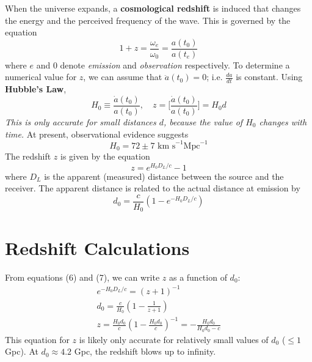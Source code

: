 \documentclass{article}
\begin{document}
When the universe expands, a \textbf{cosmological redshift} is induced that changes the energy and the perceived frequency of the wave. This is governed by the equation
\begin{equation}
    1+z = \frac{\omega_e}{\omega_0} = \frac{a(t_0)}{a(t_e)}
\end{equation}
where $e$ and $0$ denote \textit{emission} and \textit{observation} respectively. To determine a numerical value for $z$, we can assume that $\ddot{a}(t_0) = 0$; i.e. $\frac{da}{dt}$ is constant. Using \textbf{Hubble's Law}, 
\begin{equation}
    H_0 \equiv \frac{\dot{a}(t_0)}{a(t_0)}, \quad z = \Big[\frac{\dot{a}(t_0)}{a(t_0)}\Big] = H_0d
\end{equation}
\textit{This is only accurate for small distances $d$, because the value of $H_0$ changes with time.} At present, observational evidence suggests 
\begin{equation}
    H_0 = 72 \pm 7 \text{ km s}^{-1} \text{Mpc}^{-1}
\end{equation}
The redshift $z$ is given by the equation 
\begin{equation}
    z = e^{H_0D_L/c} - 1
\end{equation}
where $D_L$ is the apparent (measured) distance between the source and the receiver. The apparent distance is related to the actual distance at emission by 
\begin{equation}
    d_0 = \frac{c}{H_0}(1 - e^{-H_0D_L/c})
\end{equation}


\section{Redshift Calculations}

From equations (6) and (7), we can write $z$ as a function of $d_0$:
\begin{gather}
    e^{-H_0D_L/c} = (z+1)^{-1} \\
    d_0 = \frac{c}{H_0}(1-\frac{1}{z+1}) \\
    z = \frac{H_0d_0}{c}(1 - \frac{H_0d_0}{c})^{-1} = -\frac{H_0d_0}{H_0d_0-c}
\end{gather}
This equation for $z$ is likely only accurate for relatively small values of $d_0$ ($\leq1$ Gpc). At $d_0 \approx 4.2$ Gpc, the redshift blows up to infinity. 
\end{document}
